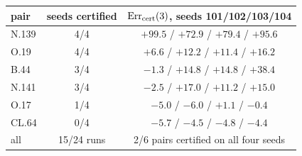 \begin{tabular}{lcc}
\toprule
pair & seeds certified & ${\rm Err}_{\rm cert}(3)$, seeds 101/102/103/104 \\
\midrule
N.139 & 4/4 & $+99.5$ / $+72.9$ / $+79.4$ / $+95.6$ \\
O.19 & 4/4 & $+6.6$ / $+12.2$ / $+11.4$ / $+16.2$ \\
B.44 & 3/4 & $-1.3$ / $+14.8$ / $+14.8$ / $+38.4$ \\
N.141 & 3/4 & $-2.5$ / $+17.0$ / $+11.2$ / $+15.0$ \\
O.17 & 1/4 & $-5.0$ / $-6.0$ / $+1.1$ / $-0.4$ \\
CL.64 & 0/4 & $-5.7$ / $-4.5$ / $-4.8$ / $-4.4$ \\
\midrule
all & 15/24 runs & 2/6 pairs certified on all four seeds \\
\bottomrule
\end{tabular}
